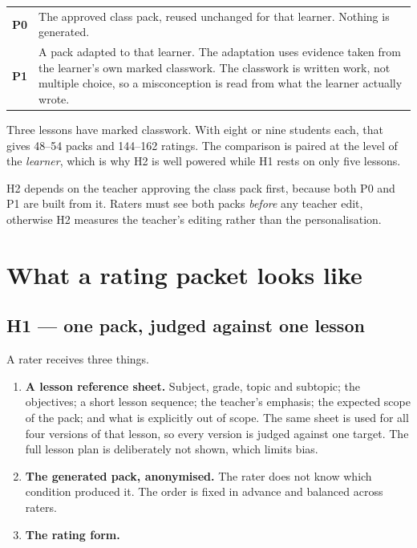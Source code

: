 \documentclass[11pt,a4paper]{article}
\begin{document}
\begin{center}
\begin{tabular}{@{}p{18mm}p{110mm}@{}}
\toprule
\textbf{P0} & The approved class pack, reused unchanged for that learner. Nothing is
generated.\\
\addlinespace
\textbf{P1} & A pack adapted to that learner. The adaptation uses evidence taken from the
learner's own marked classwork. The classwork is written work, not multiple choice, so a
misconception is read from what the learner actually wrote.\\
\bottomrule
\end{tabular}
\end{center}

\noindent Three lessons have marked classwork. With eight or nine students each, that gives
48--54 packs and 144--162 ratings. The comparison is paired at the level of the
\emph{learner}, which is why H2 is well powered while H1 rests on only five lessons.

H2 depends on the teacher approving the class pack first, because both P0 and P1 are built
from it. Raters must see both packs \emph{before} any teacher edit, otherwise H2 measures
the teacher's editing rather than the personalisation.

\section{What a rating packet looks like}

\subsection{H1 --- one pack, judged against one lesson}

A rater receives three things.

\begin{enumerate}
\item \textbf{A lesson reference sheet.} Subject, grade, topic and subtopic; the objectives;
a short lesson sequence; the teacher's emphasis; the expected scope of the pack; and what is
explicitly out of scope. The same sheet is used for all four versions of that lesson, so
every version is judged against one target. The full lesson plan is deliberately not shown,
which limits bias.
\item \textbf{The generated pack, anonymised.} The rater does not know which condition
produced it. The order is fixed in advance and balanced across raters.
\item \textbf{The rating form.}
\end{enumerate}
\end{document}

